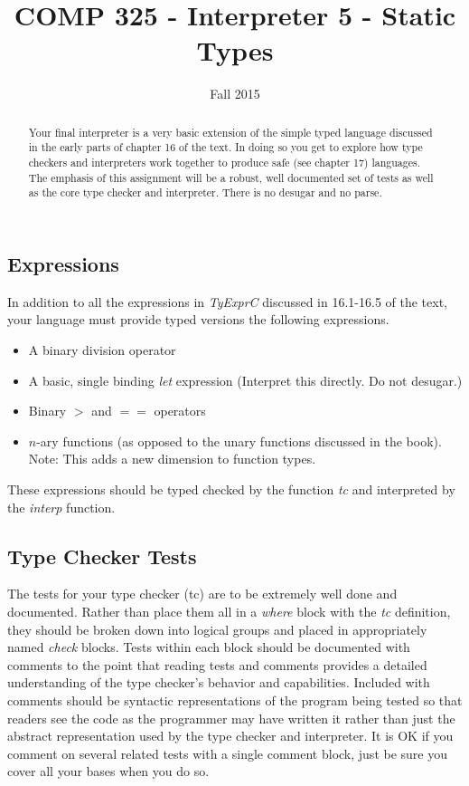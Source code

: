 \documentclass[10pt]{article}
\title{COMP 325 - Interpreter 5 - Static Types}
\author{  }
\date{Fall 2015}
\begin{document}
\maketitle

\begin{abstract}
Your final interpreter is a very basic extension of the simple typed language discussed in the early parts of chapter 16 of the text. In doing so you get to explore how type checkers and interpreters work together to produce safe (see chapter 17) languages. The emphasis of this assignment will be a robust, well documented set of tests as well as the core type checker and interpreter. There is no desugar and no parse.  
\end{abstract}

\subsection*{Expressions}

In addition to all the expressions in \textit{TyExprC} discussed in 16.1-16.5 of the text, your language  must provide typed versions the following expressions.
\begin{itemize}
\item A binary division operator
\item A basic, single binding \textit{let} expression (Interpret this directly. Do not desugar.)
\item Binary $>$ and $==$ operators
\item $n$-ary functions (as opposed to the unary functions discussed in the book). Note: This adds a new dimension to function types.
\end{itemize}
These expressions should be typed checked by the function \textit{tc} and interpreted by the \textit{interp} function. 

\subsection*{Type Checker Tests}

The tests for your type checker (tc) are to be extremely well done and documented. Rather than place them all in a \textit{where} block with the \textit{tc} definition, they should be broken down into logical groups and placed in appropriately named \textit{check} blocks. Tests within each block should be documented with comments to the point that reading tests and comments provides a detailed understanding of the type checker's behavior and capabilities.  Included with comments should be syntactic representations of the program being tested so that readers see the code as the programmer may have written it rather than just the abstract representation used by the type checker and interpreter.  It is OK if you comment on several related tests with a single comment block, just be sure you cover all your bases when you do so. 
\end{document}
